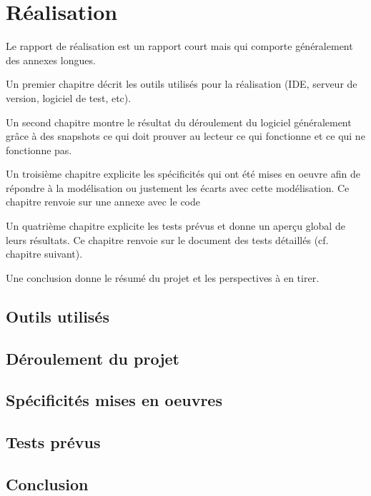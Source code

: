 	
	\part{Réalisation}
	
	\setcounter{chapter}{0} %
	\setcounter{section}{0} %
	
	\renewcommand*{\theHchapter}{\thepart.\thechapter}

Le rapport de réalisation est un rapport court mais qui comporte généralement des annexes longues.

Un premier chapitre décrit les outils utilisés pour la réalisation (IDE, serveur de version, logiciel de test, etc).

Un second chapitre montre le résultat du déroulement du logiciel généralement grâce à des snapshots ce qui doit prouver au lecteur ce qui fonctionne et ce qui ne fonctionne pas.

Un troisième chapitre explicite les spécificités qui ont été mises en oeuvre afin de répondre à la modélisation ou justement les écarts avec cette modélisation. Ce chapitre renvoie sur une annexe avec le code

Un quatrième chapitre explicite les tests prévus et donne un aperçu global de leurs résultats. Ce chapitre renvoie sur le document des tests détaillés (cf. chapitre suivant).

Une conclusion donne le résumé du projet et les perspectives à en tirer.

		\chapter{Outils utilisés}




		\chapter{Déroulement du projet}

		\chapter{Spécificités mises en oeuvres}

		\chapter{Tests prévus}

		\chapter{Conclusion}